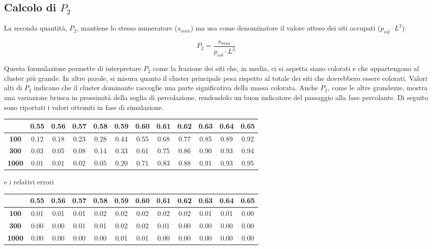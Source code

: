 \subsection{Calcolo di $P_{2}$}

La seconda quantità, $P_2$, mantiene lo stesso numeratore ($s_{max}$) ma usa come denominatore il valore atteso dei siti occupati ($p_{col} \cdot L^2$):

\vspace{4px}
\begin{equation}
P_2 = \frac{s_{max}}{p_{col} \cdot L^2}
\end{equation}

\vspace{4px}
\noindent
Questa formulazione permette di interpretare $P_2$ come la frazione dei siti che, in media, ci si aspetta siano colorati e che appartengono al cluster più grande. In altre parole, si misura quanto il cluster principale pesa rispetto al totale dei siti che dovrebbero essere colorati. Valori alti di $P_2$ indicano che il cluster dominante raccoglie una parte significativa della massa colorata. Anche $P_2$, come le altre grandezze, mostra una variazione brusca in prossimità della soglia di percolazione, rendendolo un buon indicatore del passaggio alla fase percolante. Di seguito sono riportati i valori ottenuti in fase di simulazione.

\vspace{15px}
\noindent
\begin{tabular}{|c|*{11}{c|}}
	\hline
	\textbf{} & \textbf{0.55} & \textbf{0.56} & \textbf{0.57} & \textbf{0.58} & \textbf{0.59} & \textbf{0.60} & \textbf{0.61} & \textbf{0.62} & \textbf{0.63} & \textbf{0.64} & \textbf{0.65} \\
	\hline
	\textbf{100}  & 0.12 & 0.18 & 0.23 & 0.28 & 0.44 & 0.55 & 0.68 & 0.77 & 0.85 & 0.89 & 0.92 \\
	\hline
	\textbf{300}  & 0.03 & 0.05 & 0.08 & 0.14 & 0.33 & 0.61 & 0.75 & 0.86 & 0.90 & 0.93 & 0.94 \\
	\hline
	\textbf{1000} & 0.01 & 0.01 & 0.02 & 0.05 & 0.20 & 0.71 & 0.83 & 0.88 & 0.91 & 0.93 & 0.95 \\
	\hline
\end{tabular}

\vspace{15px}
\noindent
e i relativi errori

\vspace{15px}
\noindent
\begin{tabular}{|c|*{11}{c|}}
	\hline
	\textbf{} & \textbf{0.55} & \textbf{0.56} & \textbf{0.57} & \textbf{0.58} & \textbf{0.59} & \textbf{0.60} & \textbf{0.61} & \textbf{0.62} & \textbf{0.63} & \textbf{0.64} & \textbf{0.65} \\
	\hline
	\textbf{100}  & 0.01 & 0.01 & 0.01 & 0.02 & 0.02 & 0.02 & 0.02 & 0.02 & 0.01 & 0.01 & 0.00 \\
	\hline
	\textbf{300}  & 0.00 & 0.00 & 0.01 & 0.01 & 0.02 & 0.02 & 0.01 & 0.00 & 0.00 & 0.00 & 0.00 \\
	\hline
	\textbf{1000} & 0.00 & 0.00 & 0.00 & 0.00 & 0.01 & 0.01 & 0.00 & 0.00 & 0.00 & 0.00 & 0.00 \\
	\hline
\end{tabular}

